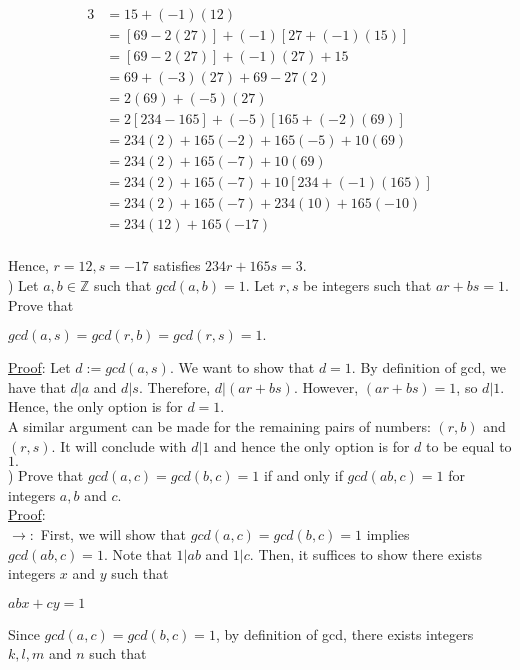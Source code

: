 \documentclass{article}
\begin{document}
\begin{align*}
3 &= 15 + (-1) (12) \\
&= [69 - 2(27)] + (-1)[27 + (-1)(15)] \\
&= [69 - 2(27)] + (-1)(27) + 15 \\
&= 69 + (-3)(27) + 69 - 27(2) \\
&= 2(69) + (-5)(27) \\
&= 2[234 - 165] + (-5)[165 + (-2)(69)] \\
&= 234(2) + 165(-2) + 165(-5) + 10(69) \\
&= 234(2) + 165(-7) + 10(69) \\
&= 234(2) + 165(-7) + 10[234 + (-1)(165)] \\
&= 234(2) + 165(-7) + 234(10) + 165(-10) \\
&= 234(12) + 165(-17) \\
\end{align*}

\noindent
Hence, $r = 12, s = -17$ satisfies $234r + 165s = 3.$ \\

) Let $a, b \in \mathbb{Z}$ such that $gcd(a, b) = 1$. Let $r, s$ be integers such that $ar + bs = 1$. Prove that 
\begin{center}
$gcd(a, s) = gcd(r, b) = gcd(r, s) = 1.$
\end{center}

\noindent
\underline{Proof}: Let $d := gcd(a, s).$ We want to show that $d = 1.$ By definition of gcd, we have that $d \vert a$ and $d \vert s$. Therefore, $d \vert (ar + bs).$ However, $(ar + bs) = 1$, so $d \vert 1.$ Hence, the only option is for $d = 1.$ \\

\noindent
A similar argument can be made for the remaining pairs of numbers: $(r, b)$ and $(r, s)$. It will conclude with $d \vert 1$ and hence the only option is for $d$ to be equal to $1.$ \\

) Prove that $gcd(a, c) = gcd(b, c) = 1$ if and only if $gcd(ab, c) = 1$ for integers $a, b$ and $c.$ \\

\noindent
\underline{Proof}: \\
$\rightarrow:$ First, we will show that $gcd(a, c) = gcd(b, c) = 1$ implies $gcd(ab, c) = 1.$ Note that $1 \vert ab$ and $1 \vert c.$ Then, it suffices to show there exists integers $x$ and $y$ such that

\begin{center}
$abx + cy = 1$ 
\end{center}
Since $gcd(a, c) = gcd(b, c) = 1$, by definition of gcd, there exists integers $k, l, m$ and $n$ such that
\end{document}
